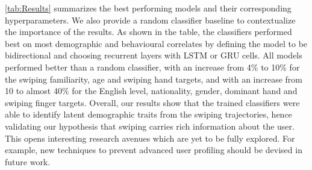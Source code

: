 \documentclass[sn-mathphys, pdflatex]{sn-jnl}
\begin{document}




\autoref{tab:Results} summarizes the best performing models and their corresponding hyperparameters.
We also provide a random classifier baseline to contextualize the importance of the results.
As shown in the table, the classifiers performed best on most demographic and behavioural correlates by defining the model to be bidirectional and choosing recurrent layers with LSTM or GRU cells. All models performed  better than a random classifier, with an increase from 4\% to 10\% for the swiping familiarity, age and swiping hand targets, and with an increase from 10 to almost 40\% for the English level, nationality, gender, dominant hand and swiping finger targets. Overall, our results show that the trained classifiers were able to identify latent demographic traits from the swiping trajectories, hence validating our hypothesis that swiping carries rich information about the user. This opens interesting research avenues which are yet to be fully explored. For example, new techniques to prevent advanced user profiling should be devised in future work.
\end{document}
